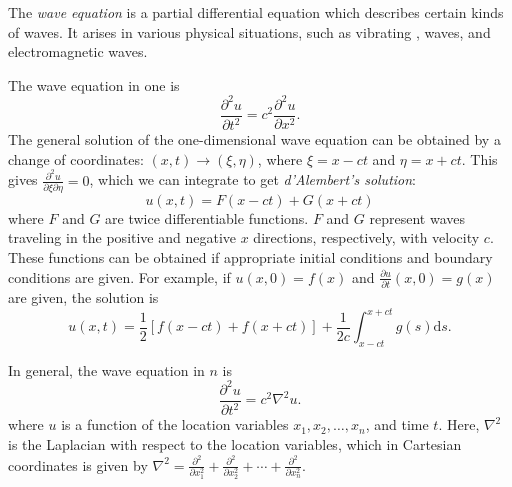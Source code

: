 \documentclass[12pt]{article}
\begin{document}
The \emph{wave equation} is a partial differential equation which
describes certain kinds of waves.  It arises in various physical
situations, such as vibrating ,  waves, and
electromagnetic waves.

The wave equation in one  is
$$
\frac{\partial^2 u}{\partial t^2}=c^2\frac{\partial^2 u}{\partial
  x^2}.
$$
The general solution of the one-dimensional wave equation can be
obtained by a change of coordinates: $(x,t)\longrightarrow(\xi,\eta)$,
where $\xi=x-ct$ and $\eta=x+ct$.  This gives $\frac{\partial^2 u}{\partial\xi\partial\eta}=0$, which we can integrate to get \emph{d'Alembert's solution}:
$$
u(x,t)=F(x-ct)+G(x+ct)
$$
where $F$ and $G$ are twice differentiable functions.  $F$ and $G$
represent waves traveling in the positive and negative $x$
directions, respectively, with velocity $c$.  These functions can be
obtained if appropriate initial conditions and boundary conditions are given.  For example, if $u(x,0)=f(x)$ and $\frac{\partial u}{\partial t}(x,0)=g(x)$ are given, the solution is
$$
u(x,t)=\frac{1}{2}[f(x-ct)+f(x+ct)]+\frac{1}{2c}\int_{x-ct}^{x+ct}g(s)\mathrm d s.
$$

In general, the wave equation in $n$  is
$$
\frac{\partial^2 u}{\partial t^2}=c^2\nabla^2 u.
$$
where $u$ is a function of the location variables
$x_1,x_2,\ldots,x_n$, and time $t$.  Here, $\nabla^2$ is the Laplacian
with respect to the location variables, which in Cartesian coordinates is given by $
\nabla^2=\frac{\partial^2}{\partial x_1^2}+\frac{\partial^2}{\partial x_2^2}+\cdots+\frac{\partial^2}{\partial x_n^2}$.
\end{document}
